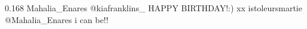 {0.168}
{\joinNameTweet
{Mahalia\_Enares}
{@kiafranklins\_ HAPPY BIRTHDAY!:) xx}}
{\joinNameTweet
{istoleursmartie}
{@Mahalia\_Enares i can be!!}}
%
%
%
%
%
%
%
%
%
%
%

